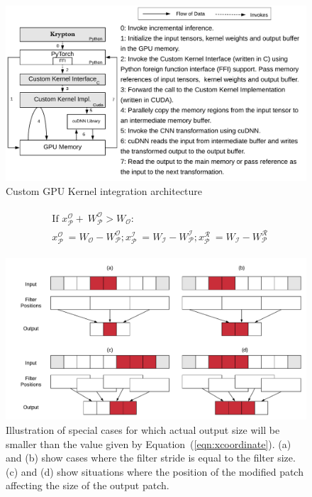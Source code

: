 \begin{figure}[t]
\includegraphics[width=\columnwidth]{images/gpu_kernel_impl.pdf}
\vspace{-6mm}
\caption{Custom GPU Kernel integration architecture}
\label{fig:custom_kernel_integration}
\end{figure}



\vspace{-4mm}
\begin{align}
\begin{split}
\label{eqn:width_subtract}
&\text{If~} x^\mathcal{O}_\mathcal{P} + ~W^\mathcal{O}_\mathcal{P} > W_{\mathcal{O}}:\\
&x^\mathcal{O}_\mathcal{P} ~ =  W_{\mathcal{O}} - W^\mathcal{O}_\mathcal{P}; 
x^\mathcal{I}_\mathcal{P} ~ = W_{\mathcal{I}} - W^\mathcal{I}_\mathcal{P}; 
x^\mathcal{R}_\mathcal{P} ~ = W_{\mathcal{I}} - W^\mathcal{R}_\mathcal{P}
\end{split}
\end{align}

\begin{figure}[t]
\includegraphics[width=\columnwidth]{images/less_one_example}
\vspace{-6mm}
\caption{Illustration of special cases for which actual output size will be smaller than the value given by Equation~(\ref{eqn:xcoordinate}). (a) and (b) show cases where the filter stride is equal to the filter size. (c) and (d) show situations where the position of the modified patch affecting the size of the output patch.}
\vspace{-4mm}
\label{fig:less_one_example}
\end{figure}


